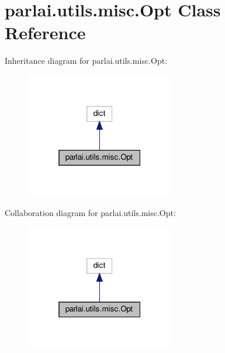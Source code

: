 \hypertarget{classparlai_1_1utils_1_1misc_1_1Opt}{}\section{parlai.\+utils.\+misc.\+Opt Class Reference}
\label{classparlai_1_1utils_1_1misc_1_1Opt}


Inheritance diagram for parlai.\+utils.\+misc.\+Opt\+:
\nopagebreak
\begin{figure}[H]
\begin{center}
\leavevmode
\includegraphics[width=184pt]{classparlai_1_1utils_1_1misc_1_1Opt__inherit__graph}
\end{center}
\end{figure}


Collaboration diagram for parlai.\+utils.\+misc.\+Opt\+:
\nopagebreak
\begin{figure}[H]
\begin{center}
\leavevmode
\includegraphics[width=184pt]{classparlai_1_1utils_1_1misc_1_1Opt__coll__graph}
\end{center}
\end{figure}
